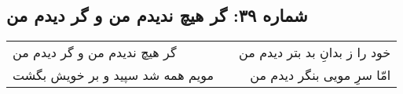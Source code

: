 \begin{center}
\section*{شماره ۳۹: گر هیچ ندیدم من و گر دیدم من}
\label{sec:039}
\begin{longtable}{l p{0.5cm} r}
گر هیچ ندیدم من و گر دیدم من
&&
خود را ز بدانِ بد بتر دیدم من
\\
مویم همه شد سپید و بر خویش بگشت
&&
امّا سرِ مویی بنگر دیدم من
\\
\end{longtable}
\end{center}
